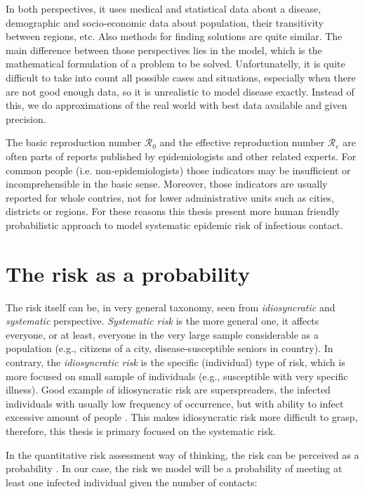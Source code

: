 \documentclass[
  digital, %
  oneside, %
  lof,     %
  lot,     %
]{fithesis4}
\begin{document}
In both perspectives, it uses medical and statistical data about a 
disease, demographic and socio-economic data about population, 
their transitivity between regions, etc. 
Also methods for finding solutions are quite similar. 
The main difference between those perspectives lies in the model, 
which is the mathematical formulation of a problem to be solved. 
Unfortunatelly, it is quite difficult to take into count all 
possible cases and situations, especially when there are not 
good enough data, so it is unrealistic to model disease exactly. 
Instead of this, we do approximations of the real world 
with best data available and given precision.

The basic reproduction number $\mathcal{R}_0$ and the effective 
reproduction number $\mathcal{R}_e$ are often parts of reports 
published by epidemiologists and other related experts.
For common people (i.e. non-epidemiologists) those indicators 
may be insufficient or incomprehensible in the basic sense.
Moreover, those indicators are usually reported for whole contries, 
not for lower administrative units such as cities, districts or regions. 
For these reasons this thesis present more human friendly 
probabilistic approach to model systematic epidemic risk of
infectious contact.


\chapter{The risk as a probability}
\label{chap:risk-as-probability}

The risk itself can be, in very general taxonomy, seen from
\textit{idiosyncratic} and \textit{systematic} perspective.
\textit{Systematic risk} is the more general one, it affects everyone, 
or at least, everyone in the very large sample considerable as a population
(e.g., citizens of a city, disease-susceptible seniors in country).
In contrary, the \textit{idiosyncratic risk} is the specific (individual) type of risk,
which is more focused on small sample of individuals (e.g., susceptible with very specific illness).
Good example of idiosyncratic risk are superspreaders, the infected
individuals with usually low frequency of occurrence, but with ability to
infect excessive amount of people \cite[Chapter~4]{brauer2008}.
This makes idiosyncratic risk more difficult to grasp, therefore, this thesis 
is primary focused on the systematic risk.

In the quantitative risk assessment way of thinking, the risk can be
perceived as a probability \cite[Chapter~14]{bahr2014}.
In our case, the risk we model will be a probability of meeting at least one
infected individual given the number of contacts:
\end{document}
